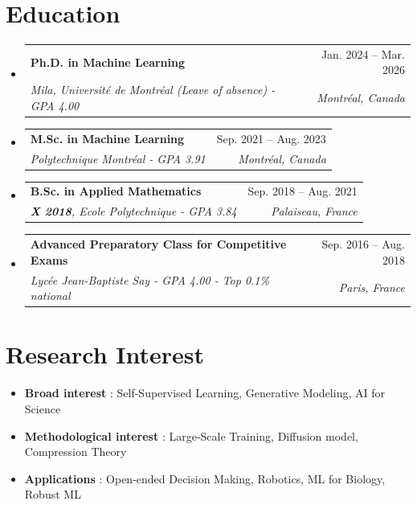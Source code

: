 \documentclass[letterpaper,11pt]{article}
\makeatletter
\newcommand{\resumeSubheading}[4]{
  \vspace{-2pt}\item
    \begin{tabular*}{0.97\textwidth}[t]{l@{\extracolsep{\fill}}r}
      \textbf{#1} & #2 \\
      \textit{\small#3} & \textit{\small #4} \\
    \end{tabular*}\vspace{-7pt}
}
\newcommand{\resumeSubHeadingListStart}{\begin{itemize}[leftmargin=0.15in, label={}]}
\newcommand{\resumeSubHeadingListEnd}{\end{itemize}}
\makeatother
\begin{document}
\section{Education}
  \resumeSubHeadingListStart
        \resumeSubheading
      {Ph.D. in Machine Learning}{Jan. 2024 -- Mar. 2026}
      {Mila, Université de Montréal (Leave of absence) - GPA 4.00}{Montréal, Canada}
      \vspace{.2pt}
      \resumeSubheading
      {M.Sc. in Machine Learning}{Sep. 2021 -- Aug. 2023}
      {Polytechnique Montréal - GPA 3.91}{Montréal, Canada}
      \vspace{.2pt}
    \resumeSubheading
      {B.Sc. in Applied Mathematics}{Sep. 2018 -- Aug. 2021}
      {\textbf{X 2018}, Ecole Polytechnique - GPA 3.84}{Palaiseau, France}
    \resumeSubheading
      {Advanced Preparatory Class for Competitive Exams}{Sep. 2016 -- Aug. 2018}
      {Lycée Jean-Baptiste Say - GPA 4.00 - Top 0.1\% national}{Paris, France}
      
  \resumeSubHeadingListEnd
\section{Research Interest}
        \begin{itemize}
            \item \textbf{Broad interest} : Self-Supervised Learning, Generative Modeling, AI for Science
            \vspace{-5pt}
            \item \textbf{Methodological interest} : Large-Scale Training, Diffusion model, Compression Theory
            \vspace{-5pt}
            \item \textbf{Applications} : Open-ended Decision Making, Robotics, ML for Biology, Robust ML
        \end{itemize}
\end{document}
